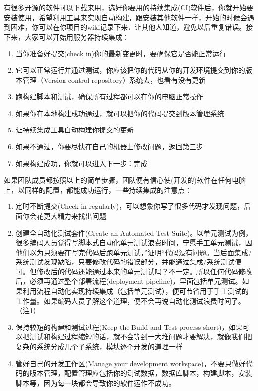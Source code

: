 有很多开源的软件可以下载来用，选好你要用的持续集成(CI)软件后，你就开始要安装使用，希望利用工具来实现自动构建，跟安装其他软件一样，开始的时候会遇到困难，你可以在你项目的wiki记录下来，让其他人知道，避免以后重复错误。接下来，大家可以开始用服务器持续集成：

\begin{enumerate}
\tightlist
\item
  当你准备好提交(check in)你的最新变更时，要确保它是否能正常运行
\item
  它可以正常运行并通过测试，你应该把你的代码从你的开发环境提交到你的版本管理（Version
  control repository）系统去，也看有没有更新
\item
  跑构建脚本和测试，确保所有过程都可以在你的电脑正常操作
\item
  如果你在本地构建成功通过，就可以把你的代码提交到版本管理系统
\item
  让持续集成工具自动构建你提交的更新
\item
  如果不通过，你要尽快在自己的机器上修改问题，返回第三步
\item
  如果构建成功，你就可以进入下一步：完成
\end{enumerate}

如果团队成员都按照以上的简单步骤，团队便有信心使(开发的)软件在任何电脑上，以同样的配置，都能成功运行，一些持续集成的注意点：

\begin{enumerate}
\tightlist
\item
  定时不断提交(Check in
  regularly)，可以想象你写了很多代码才发现问题，后面你会花更大精力来找出问题
\item
  创建全自动化测试套件(Create an Automated Test
  Suite)。以单元测试为例，很多编码人员觉得写脚本式自动化单元测试浪费时间，宁愿手工单元测试，因他们以为只须要在写完代码后跑单元测试，''证明``代码没有问题。当后面集成/系统测试发现缺陷，只要修改代码的错误部分，并能通过集成/系统测试便可。但修改后的代码还能通过本来的单元测试吗？不一定。所以任何代码修改后，必须再通过整个部署流程(deployment
  pipeline)，里面包括单元测试。如果利用流程自动化实现持续集成（包括单元测试），便可节省用于手工测试的工作量。如果编码人员了解这个道理，便不会再说自动化测试浪费时间了。（注1）
\item
  保持较短的构建和测试过程(Keep the Build and Test process
  short)，如果可以把测试和构建过程缩短的话，就不会等到一大堆问题才要解决，就像我们把复杂的系统分成几个子系统，模块逐个开发的道理一样
\item
  管好自己的开发工作区(Manage your development
  workspace)，不要只做好代码的版本管理，配置管理应包括你的测试数据，数据库脚本，构建脚本，安装脚本等，因为每一块都会导致你的软件运作不成功。
\end{enumerate}

